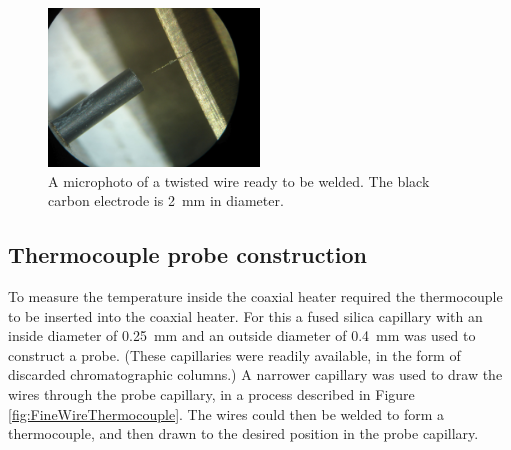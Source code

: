 \begin{figure}
	\centering
	\includegraphics[width=0.5\textwidth]{Figures/WelderMicro.jpg}
	\decoRule
	
\caption[A microphoto of a thermocouple twist ready to be welded.]{A microphoto
of a twisted wire ready to be welded. The black carbon electrode is
\SI{2}{\milli\metre} in diameter.}
	
	\label{fig:TCWeldMicro}
\end{figure}

\subsection{Thermocouple probe construction}

To measure the temperature inside the coaxial heater required the thermocouple
to be inserted into the coaxial heater. For this a fused silica capillary with
an inside diameter of \SI{0.25}{\milli\metre} and an outside diameter of
\SI{0.4}{\milli\metre} was used to construct a probe. (These capillaries were
readily available, in the form of discarded chromatographic columns.) A narrower
capillary was used to draw the wires through the probe capillary, in a process
described in Figure \ref{fig:FineWireThermocouple}. The wires could then be
welded to form a thermocouple, and then drawn to the desired position in the
probe capillary.

